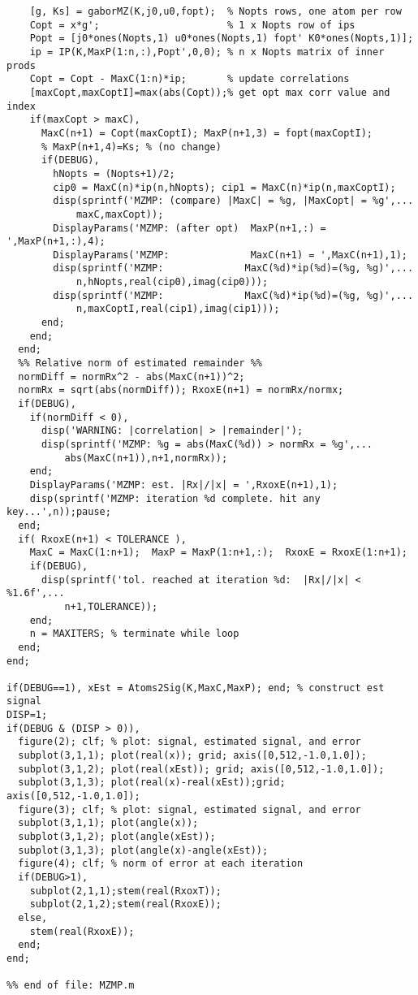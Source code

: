 \begin{small}
\begin{verbatim}
    [g, Ks] = gaborMZ(K,j0,u0,fopt);  % Nopts rows, one atom per row
    Copt = x*g';                      % 1 x Nopts row of ips
    Popt = [j0*ones(Nopts,1) u0*ones(Nopts,1) fopt' K0*ones(Nopts,1)];
    ip = IP(K,MaxP(1:n,:),Popt',0,0); % n x Nopts matrix of inner prods
    Copt = Copt - MaxC(1:n)*ip;       % update correlations
    [maxCopt,maxCoptI]=max(abs(Copt));% get opt max corr value and index
    if(maxCopt > maxC),
      MaxC(n+1) = Copt(maxCoptI); MaxP(n+1,3) = fopt(maxCoptI); 
      % MaxP(n+1,4)=Ks; % (no change)
      if(DEBUG),
        hNopts = (Nopts+1)/2;
        cip0 = MaxC(n)*ip(n,hNopts); cip1 = MaxC(n)*ip(n,maxCoptI);
        disp(sprintf('MZMP: (compare) |MaxC| = %g, |MaxCopt| = %g',...
            maxC,maxCopt));
        DisplayParams('MZMP: (after opt)  MaxP(n+1,:) = ',MaxP(n+1,:),4);
        DisplayParams('MZMP:              MaxC(n+1) = ',MaxC(n+1),1);
        disp(sprintf('MZMP:              MaxC(%d)*ip(%d)=(%g, %g)',...
            n,hNopts,real(cip0),imag(cip0)));
        disp(sprintf('MZMP:              MaxC(%d)*ip(%d)=(%g, %g)',...
            n,maxCoptI,real(cip1),imag(cip1)));
      end;
    end;
  end;
  %% Relative norm of estimated remainder %%
  normDiff = normRx^2 - abs(MaxC(n+1))^2;
  normRx = sqrt(abs(normDiff)); RxoxE(n+1) = normRx/normx;
  if(DEBUG),
    if(normDiff < 0),
      disp('WARNING: |correlation| > |remainder|');
      disp(sprintf('MZMP: %g = abs(MaxC(%d)) > normRx = %g',...
          abs(MaxC(n+1)),n+1,normRx)); 
    end;
    DisplayParams('MZMP: est. |Rx|/|x| = ',RxoxE(n+1),1);    
    disp(sprintf('MZMP: iteration %d complete. hit any key...',n));pause;
  end;
  if( RxoxE(n+1) < TOLERANCE ),
    MaxC = MaxC(1:n+1);  MaxP = MaxP(1:n+1,:);  RxoxE = RxoxE(1:n+1); 
    if(DEBUG),
      disp(sprintf('tol. reached at iteration %d:  |Rx|/|x| < %1.6f',...
          n+1,TOLERANCE));
    end;
    n = MAXITERS; % terminate while loop
  end;
end;

if(DEBUG==1), xEst = Atoms2Sig(K,MaxC,MaxP); end; % construct est signal
DISP=1;
if(DEBUG & (DISP > 0)),
  figure(2); clf; % plot: signal, estimated signal, and error
  subplot(3,1,1); plot(real(x)); grid; axis([0,512,-1.0,1.0]);
  subplot(3,1,2); plot(real(xEst)); grid; axis([0,512,-1.0,1.0]);
  subplot(3,1,3); plot(real(x)-real(xEst));grid; axis([0,512,-1.0,1.0]);
  figure(3); clf; % plot: signal, estimated signal, and error
  subplot(3,1,1); plot(angle(x));
  subplot(3,1,2); plot(angle(xEst));
  subplot(3,1,3); plot(angle(x)-angle(xEst));
  figure(4); clf; % norm of error at each iteration
  if(DEBUG>1),
    subplot(2,1,1);stem(real(RxoxT));
    subplot(2,1,2);stem(real(RxoxE));
  else,
    stem(real(RxoxE));
  end;
end;

%% end of file: MZMP.m
\end{verbatim}\end{small}

